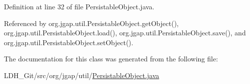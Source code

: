 Definition at line 32 of file Persistable\-Object.\-java.



Referenced by org.\-jgap.\-util.\-Persistable\-Object.\-get\-Object(), org.\-jgap.\-util.\-Persistable\-Object.\-load(), org.\-jgap.\-util.\-Persistable\-Object.\-save(), and org.\-jgap.\-util.\-Persistable\-Object.\-set\-Object().



The documentation for this class was generated from the following file\-:\begin{DoxyCompactItemize}
\item 
L\-D\-H\-\_\-\-Git/src/org/jgap/util/\hyperlink{_persistable_object_8java}{Persistable\-Object.\-java}\end{DoxyCompactItemize}
